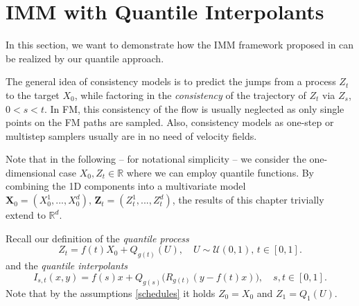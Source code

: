 \documentclass{article}
\newcommand{\R}{\mathbb{R}}
\theoremstyle{plain}
\theoremstyle{definition}
\theoremstyle{remark}
\begin{document}
\section{IMM with Quantile Interpolants}\label{app:IMM}
In this section, we want to demonstrate how the IMM framework proposed in \cite{IMM2025} can be realized by our quantile approach.

{ The general idea of consistency models is to predict the jumps from a process $Z_t$ to the target $X_0$, while factoring in the \emph{consistency} of the trajectory of $Z_t$ via $Z_s$, $0 < s < t$.
In FM, this consistency of the flow is usually neglected as only single points on the FM paths are sampled. Also, consistency models as one-step or multistep samplers usually are in no need of velocity fields.}

Note that in the following -- for notational simplicity -- we consider the one-dimensional case $X_0, Z_t \in \R$ where we can employ quantile functions. By combining the 1D components into a multivariate model
$\mathbf{X}_0 = (X_0^1,...,X_0^d), \, \mathbf{Z}_t = (Z_t^1,...,Z_t^d)$, the results of this chapter trivially extend to $\R^d$.

Recall our definition of the \emph{quantile process}
\begin{equation}\label{quantile-process_A}
    Z_t = f(t) X_0 + Q_{g(t)}(U), \quad U \sim \mathcal U(0,1),\, t \in [0,1].
\end{equation}
and the \emph{quantile interpolants}
\begin{equation}\label{quantile-interpolant_A}
    I_{s,t}(x, y) = f(s) x + Q_{g(s)}\big(R_{g(t)}(y - f(t)x) \big), \quad s,t \in [0,1].
\end{equation}
Note that by the assumptions \eqref{schedules} it holds $Z_0 = X_0$ and $Z_1 = Q_1(U)$.
\end{document}

